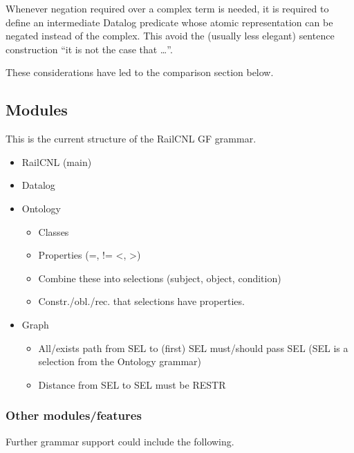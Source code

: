 \documentclass[]{article}
\providecommand{\tightlist}{%
  \setlength{\itemsep}{0pt}\setlength{\parskip}{0pt}}
\begin{document}
Whenever negation required over a complex term is needed, it is required
to define an intermediate Datalog predicate whose atomic representation
can be negated instead of the complex. This avoid the (usually less
elegant) sentence construction ``it is not the case that \ldots{}''.

These considerations have led to the comparison section below.

\subsection{Modules}\label{modules}

This is the current structure of the RailCNL GF grammar.

\begin{itemize}
\item
  RailCNL (main)
\item
  Datalog
\item
  Ontology

  \begin{itemize}
  \tightlist
  \item
    Classes
  \item
    Properties (=, != \textless{}, \textgreater{})
  \item
    Combine these into selections (subject, object, condition)
  \item
    Constr./obl./rec. that selections have properties.
  \end{itemize}
\item
  Graph

  \begin{itemize}
  \tightlist
  \item
    All/exists path from SEL to (first) SEL must/should pass SEL (SEL is
    a selection from the Ontology grammar)
  \item
    Distance from SEL to SEL must be RESTR
  \end{itemize}
\end{itemize}

\subsubsection{Other modules/features}\label{other-modulesfeatures}

Further grammar support could include the following.
\end{document}

